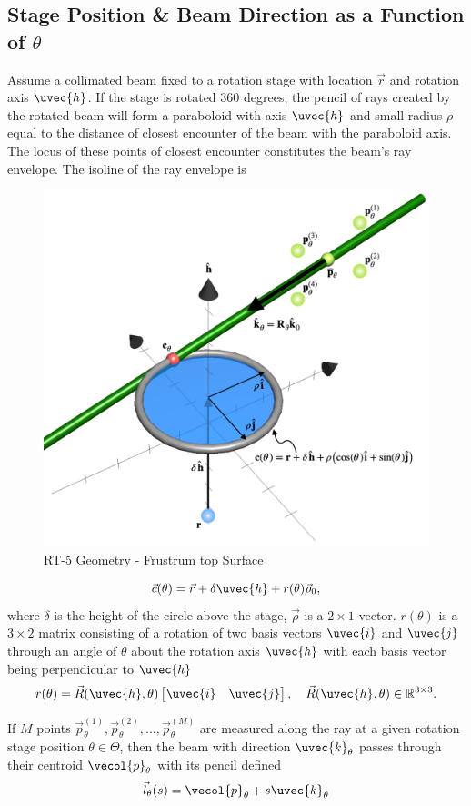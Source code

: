 \subsection{Stage Position \& Beam Direction as a Function of $\theta$}
Assume a collimated beam fixed to a rotation stage with location $\vec{r}$ and rotation axis $\uvec{h}$. If the stage is rotated 360 degrees, the pencil of rays created by the rotated beam will form a paraboloid with axis $\uvec{h}$ and small radius $\rho$ equal to the distance of closest encounter of the beam with the paraboloid axis. The locus of these points of closest encounter constitutes the beam's ray envelope.  The isoline of the ray envelope is
%
\begin{figure}
    \centering
    \includegraphics[width=0.5\linewidth]{../figures/envelope_geometry.png}
    \caption{RT-5 Geometry - Frustrum top Surface}
    \label{fig:frustrum}
\end{figure}
%
\begin{equation}
    \vec{c}(\theta) = \vec{r} + \delta \uvec{h} + r(\theta) \vec{\rho}_0,
    \label{eqn:envelope}
\end{equation}
%
where $\delta$ is the height of the circle above the stage, $\vec{\rho}$ is a $2 \times 1$ vector. $r(\theta)$ is a $3 \times 2$ matrix consisting of a rotation of two basis vectors $\uvec{i}$ and $\uvec{j}$ through an angle of $\theta$ about the rotation axis $\uvec{h}$ with each basis vector being perpendicular to $\uvec{h}$
%
\begin{equation}
    r(\theta) = \vec{R}(\uvec{h}, \theta) \begin{bmatrix}
        \uvec{i} & \uvec{j}
    \end{bmatrix},
    \quad \vec{R}(\uvec{h}, \theta) \in \mathbb{R}^{3 \times 3}.
\end{equation}

If $M$ points $\vec{p}_\theta^{(1)}, \vec{p}_\theta^{(2)}, ..., \vec{p}_\theta^{(M)}$ are measured along the ray at a given rotation stage position $\theta \in \Theta$, then the beam with direction $\uvec{k}_{\theta}$ passes through their centroid $\vecol{p}_\theta$ with its pencil defined
%
\begin{align}
    \vec{l}_\theta(s) = \vecol{p}_\theta + s \uvec{k}_{\theta}
\end{align}

